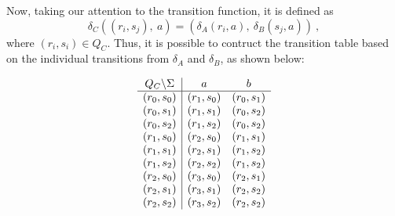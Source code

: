 \begin{solution}
    Now, taking our attention to the transition function, it is defined as
    \begin{equation*}
        \delta_C\left((r_i, s_j),\ a\right) = \left(\delta_A(r_i, a),\ \delta_B(s_j, a)\right)\ ,
    \end{equation*}
    where $(r_i, s_i) \in Q_C$. Thus, it is possible to contruct the transition table based on the individual transitions from $\delta_A$ and $\delta_B$, as shown below:
    \setlength{\columnsep}{-1.5cm}
    \begin{multicols}{2}
        \begin{equation*}
            \begin{array}{c | c c}
                Q_C \backslash \Sigma & a & b \\
                \hline
                (r_0, s_0) & (r_1, s_0) & (r_0, s_1) \\
                (r_0, s_1) & (r_1, s_1) & (r_0, s_2) \\
                (r_0, s_2) & (r_1, s_2) & (r_0, s_2) \\
    
                (r_1, s_0) & (r_2, s_0) & (r_1, s_1) \\
                (r_1, s_1) & (r_2, s_1) & (r_1, s_2) \\
                (r_1, s_2) & (r_2, s_2) & (r_1, s_2) \\
    
                (r_2, s_0) & (r_3, s_0) & (r_2, s_1) \\
                (r_2, s_1) & (r_3, s_1) & (r_2, s_2) \\
                (r_2, s_2) & (r_3, s_2) & (r_2, s_2) \\
    

\end{array}
\end{equation*}
\end{multicols}
\end{solution}
